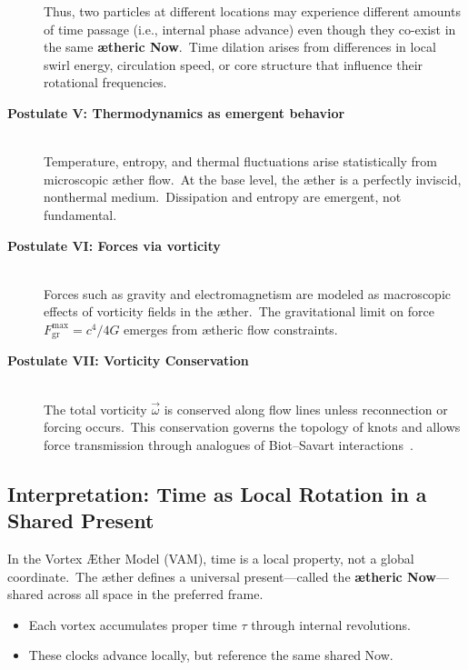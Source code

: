 \begin{description}
    Thus, two particles at different locations may experience different amounts of time passage (i.e., internal phase advance) even though they co-exist in the same \textbf{ætheric Now}.\ Time dilation arises from differences in local swirl energy, circulation speed, or core structure that influence their rotational frequencies.

    \item[\textbf{Postulate V: Thermodynamics as emergent behavior}] \hfill \\
    Temperature, entropy, and thermal fluctuations arise statistically from microscopic æther flow.\ At the base level, the æther is a perfectly inviscid, nonthermal medium.\ Dissipation and entropy are emergent, not fundamental.

    \item[\textbf{Postulate VI: Forces via vorticity}] \hfill \\
    Forces such as gravity and electromagnetism are modeled as macroscopic effects of vorticity fields in the æther.\ The gravitational limit on force $F^{\max}_{\text{gr}} = c^4 / 4 G$ emerges from ætheric flow constraints.

    \item[\textbf{Postulate VII: Vorticity Conservation}] \hfill \\
    The total vorticity $\vec{\omega}$ is conserved along flow lines unless reconnection or forcing occurs.\ This conservation governs the topology of knots and allows force transmission through analogues of Biot–Savart interactions~\cite{helmholtz1858vortices}.
\end{description}


\subsection*{Interpretation: Time as Local Rotation in a Shared Present}

In the Vortex Æther Model (VAM), time is a local property, not a global coordinate.\ The æther defines a universal present—called the \textbf{ætheric Now}—shared across all space in the preferred frame.

\begin{itemize}
    \item Each vortex accumulates proper time $\tau$ through internal revolutions.
    \item These clocks advance locally, but reference the same shared Now.
\end{itemize}

